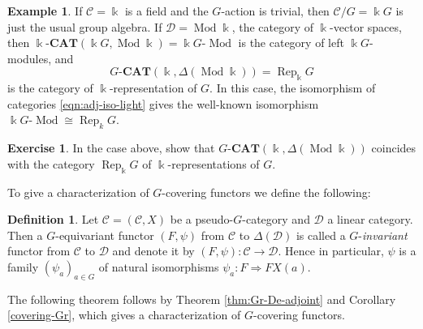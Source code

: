 \documentclass{surv-l}
\numberwithin{equation}{chapter}
\numberwithin{figure}{chapter}
\theoremstyle{plain}
\theoremstyle{definition}
\newtheorem{dfn}[thm]{Definition}
\newtheorem{exm}[thm]{Example}
\newtheorem{exc}[thm]{Exercise}
\theoremstyle{remark}
\newcommand{\kCAT}{\Bbbk\text{-}\mathbf{CAT}}
\newcommand{\GCAT}{G\text{-}\mathbf{CAT}}
\DeclareMathOperator{\Rep}{Rep}
\DeclareMathOperator{\Mod}{Mod}
\begin{document}
\begin{exm}\label{exm:adjuster-representation}
If ${\mathcal{C}} = \Bbbk$ is a field and the $G$-action is trivial, then
${\mathcal{C}}/G = \Bbbk G$ is just the usual group algebra.
If ${\mathcal{D}} = \Mod \Bbbk$, the category of $\Bbbk$-vector spaces, then
$
\kCAT(\Bbbk G, \Mod \Bbbk)=  \Bbbk G\text{-}\Mod
$
is the category of left $\Bbbk G$-modules,
and
\begin{equation*}
\GCAT(\Bbbk, \Delta(\Mod \Bbbk))=\Rep_{\Bbbk}G
\end{equation*}
is the category of $\Bbbk$-representation of $G$.
In this case, the isomorphism of categories
\eqref{eqn:adj-iso-light} gives the well-known isomorphism
$\Bbbk G\text{-}\Mod \cong \Rep_{k}G$.
\end{exm}

\begin{exc}
In the case above, show that $\GCAT(\Bbbk, \Delta(\Mod \Bbbk))$
coincides with the category $\Rep_{\Bbbk}G$ of $\Bbbk$-representations of $G$.
\end{exc}

To give a characterization of
$G$-covering functors we define the following:

\begin{dfn}
Let ${\mathcal{C}}=({\mathcal{C}}, X)$ be a pseudo-$G$-category and
${\mathcal{D}}$ a linear category.
Then a $G$-equivariant functor $(F, \psi)$ from ${\mathcal{C}}$
to $\Delta({\mathcal{D}})$ is called a $G$-\emph{invariant} functor
from ${\mathcal{C}}$ to ${\mathcal{D}}$ and denote it by
$(F, \psi)\colon {\mathcal{C}} \to {\mathcal{D}}$.
Hence in particular, $\psi$ is a family $(\psi_{a})_{a\in G}$
of natural isomorphisms
$\psi_{a}\colon F\Rightarrow FX({a})$.
\end{dfn}

The following theorem follows by
Theorem \ref{thm:Gr-De-adjoint} and Corollary \ref{covering-Gr},
which gives a characterization of $G$-covering functors.
\end{document}
